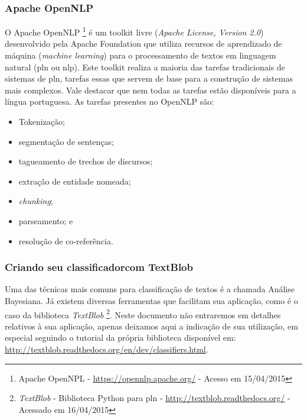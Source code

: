 \subsubsection{Apache OpenNLP}
O Apache OpenNLP%
\footnote{Apache OpenNPL - \url{https://opennlp.apache.org/} - Acesso em 15/04/2015}
é um \gls{toolkit} livre (\textit{Apache License, Version 2.0}) desenvolvido pela Apache Foundation que utiliza recursos de aprendizado de máquina (\textit{machine learning}) para o processamento de textos em linguagem natural (\gls{pln} ou \gls{nlp}). Este \gls{toolkit} realiza a maioria das tarefas tradicionais de sistemas de \gls{pln}, tarefas essas que servem de base para a construção de sistemas mais complexos. Vale destacar que nem todas as tarefas estão disponíveis para a língua portuguesa. As tarefas presentes no OpenNLP são:
\begin{itemize}
\item Tokenização;
\item segmentação de sentenças;
\item tagueamento de trechos de discursos;
\item extração de entidade nomeada;
\item \textit{chunking};
\item parseamento; e
\item resolução de co-referência.
\end{itemize}

\subsubsection{Criando seu classificadorcom TextBlob}
Uma das técnicas mais comuns para classificação de textos é a chamada Análise Bayesiana. Já existem diversas ferramentas que facilitam sua aplicação, como é o caso da biblioteca \textit{TextBlob}%
\footnote{\textit{TextBlob} - Biblioteca Python para \gls{pln} - \url{http://textblob.readthedocs.org/} - Acessado em 16/04/2015}.
Neste documento não entraremos em detalhes relativos à sua aplicação, apenas deixamos aqui a indicação de sua utilização, em especial seguindo o tutorial da própria biblioteca disponível em: \url{http://textblob.readthedocs.org/en/dev/classifiers.html}.
